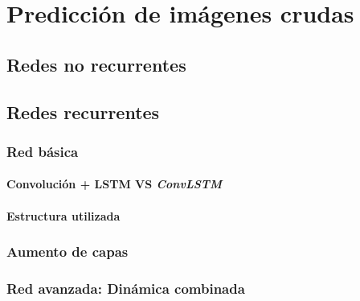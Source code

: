 \chapter{Predicción de imágenes crudas}\label{cap.redes3dcrud}

\section{Redes no recurrentes}

\section{Redes recurrentes}
\subsection{Red básica}
\subsubsection{Convolución + LSTM VS \textit{ConvLSTM}}
\subsubsection{Estructura utilizada}
\subsection{Aumento de capas}
\subsection{Red avanzada: Dinámica combinada}
